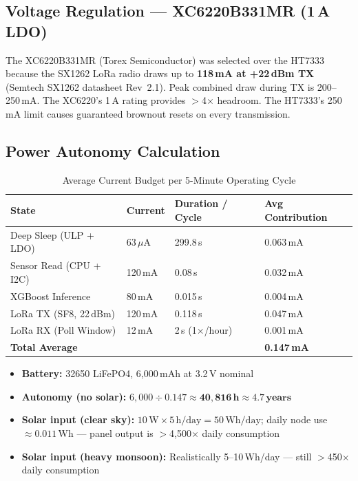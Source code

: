 \documentclass[12pt,a4paper]{article}
\begin{document}
\subsection{Voltage Regulation --- XC6220B331MR (1\,A LDO)}

The XC6220B331MR (Torex Semiconductor) was selected over the HT7333 because the SX1262 LoRa radio draws up to \textbf{118\,mA at +22\,dBm TX} (Semtech SX1262 datasheet Rev~2.1). Peak combined draw during TX is 200--250\,mA. The XC6220's 1\,A rating provides $>$4$\times$ headroom. The HT7333's 250\,mA limit causes guaranteed brownout resets on every transmission.

\subsection{Power Autonomy Calculation}

\begin{table}[h!]
\centering
\caption{Average Current Budget per 5-Minute Operating Cycle}
\begin{tabular}{L{4cm} C{2.2cm} C{3cm} C{2.8cm}}
\toprule
\textbf{State} & \textbf{Current} & \textbf{Duration / Cycle} & \textbf{Avg Contribution} \\
\midrule
Deep Sleep (ULP + LDO) & 63\,$\mu$A & 299.8\,s & 0.063\,mA \\
Sensor Read (CPU + I2C) & 120\,mA & 0.08\,s & 0.032\,mA \\
XGBoost Inference & 80\,mA & 0.015\,s & 0.004\,mA \\
LoRa TX (SF8, 22\,dBm) & 120\,mA & 0.118\,s & 0.047\,mA \\
LoRa RX (Poll Window) & 12\,mA & 2\,s (1$\times$/hour) & 0.001\,mA \\
\midrule
\textbf{Total Average} & & & \textbf{0.147\,mA} \\
\bottomrule
\end{tabular}
\end{table}

\begin{itemize}
    \item \textbf{Battery:} 32650 LiFePO4, 6{,}000\,mAh at 3.2\,V nominal
    \item \textbf{Autonomy (no solar):} $6{,}000 \div 0.147 \approx \mathbf{40{,}816\,h \approx 4.7\,years}$
    \item \textbf{Solar input (clear sky):} $10\,\text{W} \times 5\,\text{h/day} = 50\,\text{Wh/day}$; daily node use $\approx 0.011\,\text{Wh}$ --- panel output is $>$4{,}500$\times$ daily consumption
    \item \textbf{Solar input (heavy monsoon):} Realistically 5--10\,Wh/day --- still $>$450$\times$ daily consumption
\end{itemize}
\end{document}
